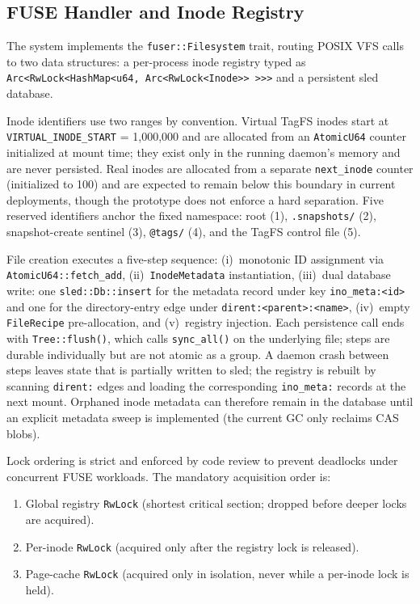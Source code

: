 \documentclass[journal]{IEEEtran}
\begin{document}
\subsection{FUSE Handler and Inode Registry}

The system implements the \texttt{fuser::Filesystem} trait, routing POSIX
VFS calls to two data structures: a per-process inode registry typed as
\texttt{Arc\textless{}RwLock\textless{}HashMap\textless{}u64,
Arc\textless{}RwLock\textless{}Inode\textgreater{}\textgreater{}%
\textgreater{}\textgreater{}\textgreater{}} and a persistent sled database.

Inode identifiers use two ranges by convention.  Virtual TagFS inodes
start at \texttt{VIRTUAL\_INODE\_START} = 1,000,000 and are allocated
from an \texttt{AtomicU64} counter initialized at mount time; they exist
only in the running daemon's memory and are never persisted.  Real inodes
are allocated from a separate \texttt{next\_inode} counter (initialized
to 100) and are expected to remain below this boundary in current
deployments, though the prototype does not enforce a hard separation.
Five reserved identifiers anchor the fixed namespace:
root (1), \texttt{.snapshots/} (2), snapshot-create sentinel (3),
\texttt{@tags/} (4), and the TagFS control file (5).

File creation executes a five-step sequence: (i)~monotonic ID
assignment via \texttt{AtomicU64::fetch\_add}, (ii)~\texttt{InodeMetadata}
instantiation, (iii)~dual database write: one \texttt{sled::Db::insert}
for the metadata record under key \texttt{ino\_meta:\textless{}id\textgreater{}}
and one for the directory-entry edge under
\texttt{dirent:\textless{}parent\textgreater{}:\textless{}name\textgreater{}},
(iv)~empty \texttt{FileRecipe} pre-allocation, and (v)~registry injection.
Each persistence call ends with \texttt{Tree::flush()}, which calls
\texttt{sync\_all()} on the underlying file; steps are durable
individually but are not atomic as a group.  A daemon crash between
steps leaves state that is partially written to sled; the registry is
rebuilt by scanning \texttt{dirent:} edges and loading the corresponding
\texttt{ino\_meta:} records at the next mount.  Orphaned inode metadata
can therefore remain in the database until an explicit metadata sweep
is implemented (the current GC only reclaims CAS blobs).

Lock ordering is strict and enforced by code review to prevent
deadlocks under concurrent FUSE workloads.  The mandatory acquisition
order is:
\begin{enumerate}
\item Global registry \texttt{RwLock} (shortest critical section; dropped
  before deeper locks are acquired).
\item Per-inode \texttt{RwLock} (acquired only after the registry lock
  is released).
\item Page-cache \texttt{RwLock} (acquired only in isolation, never while
  a per-inode lock is held).
\end{enumerate}
\end{document}
